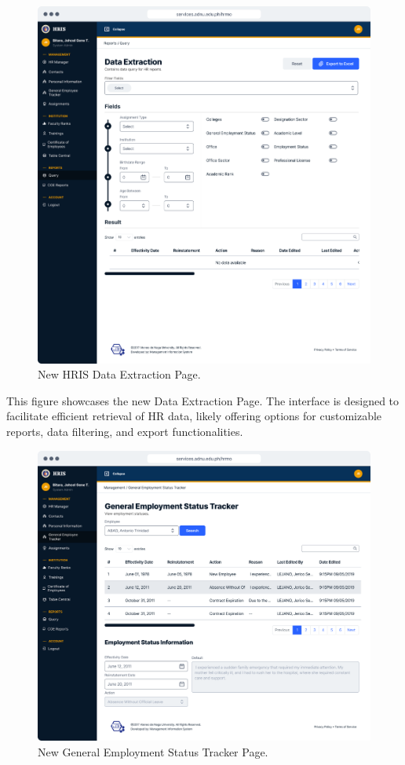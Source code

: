     \begin{figure}[H]
        \centering
        \includegraphics[width=1\linewidth]{figures/app/data-extraction.png}
        \caption{New HRIS Data Extraction Page.}
        \label{fig:app-data-extraction}
    \end{figure}

    This figure showcases the new Data Extraction Page. The interface is designed to facilitate efficient retrieval of HR data, likely offering options for customizable reports, data filtering, and export functionalities.

    \begin{figure}[H]
        \centering
        \includegraphics[width=1\linewidth]{figures/app/gest.png}
        \caption{New General Employment Status Tracker Page.}
        \label{fig:app-gest}
    \end{figure}

